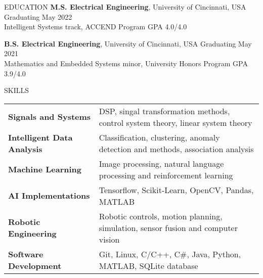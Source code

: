 \documentclass{resume} %
\begin{document}
	


	
	\begin{rSection}{EDUCATION}
	{\bf M.S. Electrical Engineering}, University of Cincinnati, USA \hfill {Graduating May 2022} \\
	Intelligent Systems track, ACCEND Program \hfill GPA 4.0/4.0 \smallskip
	
	{\bf B.S. Electrical Engineering}, University of Cincinnati, USA \hfill {Graduating May 2021}\\
	Mathematics and Embedded Systems minor, University Honors Program \hfill {GPA 3.9/4.0}
		
		
		
	\end{rSection}
	
	\begin{rSection}{SKILLS}
		
		\begin{tabular}{ @{} >{\bfseries}l @{\hspace{2ex}} l }
			Signals and Systems & DSP, singal transformation methods, control system theory, linear system theory \\
			Intelligent Data Analysis & Classification, clustering, anomaly detection and methods, association analysis \\
			Machine Learning & Image processing, natural language processing and reinforcement learning \\
			AI Implementations & Tensorflow, Scikit-Learn, OpenCV, Pandas, MATLAB\\
			Robotic Engineering &  Robotic controls, motion planning, simulation, sensor fusion and computer vision \\
			Software Development & Git, Linux, C/C++, C\#, Java, Python, MATLAB, SQLite database \\

		\end{tabular}
	\end{rSection}
	
\end{document}
